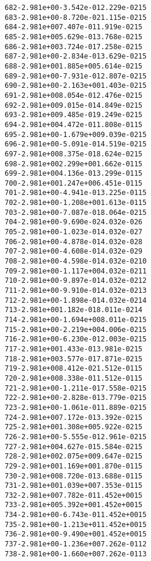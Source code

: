 \begin{alltt}
 682  -2.981e+00  -3.542e-01   2.229e-02   15
 683  -2.981e+00  -8.720e-02   1.115e-02   15
 684  -2.981e+00   7.407e-01   1.919e-02   15
 685  -2.981e+00   5.629e-01   3.768e-02   15
 686  -2.981e+00   3.724e-01   7.258e-02   15
 687  -2.981e+00  -2.834e-01   3.629e-02   15
 688  -2.981e+00   1.885e+00   5.614e-02   15
 689  -2.981e+00  -7.931e-01   2.807e-02   15
 690  -2.981e+00  -2.163e+00   1.403e-02   15
 691  -2.981e+00   8.054e-01   2.476e-02   15
 692  -2.981e+00   9.015e-01   4.849e-02   15
 693  -2.981e+00   9.485e-01   9.249e-02   15
 694  -2.981e+00   4.472e-01   1.808e-01   15
 695  -2.981e+00  -1.679e+00   9.039e-02   15
 696  -2.981e+00  -5.091e-01   4.519e-02   15
 697  -2.981e+00   8.375e-01   8.624e-02   15
 698  -2.981e+00   2.299e+00   1.662e-01   15
 699  -2.981e+00   4.136e-01   3.299e-01   15
 700  -2.981e+00   1.247e+00   6.451e-01   15
 701  -2.981e+00  -4.941e-01   3.225e-01   15
 702  -2.981e+00  -1.208e+00   1.613e-01   15
 703  -2.981e+00  -7.087e-01   8.064e-02   15
 704  -2.981e+00  -9.690e-02   4.032e-02    6
 705  -2.981e+00  -1.023e-01   4.032e-02    7
 706  -2.981e+00  -4.878e-01   4.032e-02    8
 707  -2.981e+00  -4.608e-01   4.032e-02    9
 708  -2.981e+00  -4.598e-01   4.032e-02   10
 709  -2.981e+00  -1.117e+00   4.032e-02   11
 710  -2.981e+00  -9.897e-01   4.032e-02   12
 711  -2.981e+00  -9.910e-01   4.032e-02   13
 712  -2.981e+00  -1.898e-01   4.032e-02   14
 713  -2.981e+00   1.182e-01   8.011e-02   14
 714  -2.981e+00  -1.694e+00   8.011e-02   15
 715  -2.981e+00  -2.219e+00   4.006e-02   15
 716  -2.981e+00  -6.230e-01   2.003e-02   15
 717  -2.981e+00   1.433e-01   3.981e-02   15
 718  -2.981e+00   3.577e-01   7.871e-02   15
 719  -2.981e+00   8.412e-02   1.512e-01   15
 720  -2.981e+00   8.338e-01   1.512e-01   15
 721  -2.981e+00  -1.211e-01   7.558e-02   15
 722  -2.981e+00  -2.828e-01   3.779e-02   15
 723  -2.981e+00  -1.061e-01   1.889e-02   15
 724  -2.981e+00   7.172e-01   3.392e-02   15
 725  -2.981e+00   1.308e+00   5.922e-02   15
 726  -2.981e+00  -5.555e-01   2.961e-02   15
 727  -2.981e+00   4.627e-01   5.584e-02   15
 728  -2.981e+00   2.075e+00   9.647e-02   15
 729  -2.981e+00   1.169e+00   1.870e-01   15
 730  -2.981e+00   8.720e-01   3.688e-01   15
 731  -2.981e+00   1.039e+00   7.353e-01   15
 732  -2.981e+00   7.782e-01   1.452e+00   15
 733  -2.981e+00   5.392e+00   1.452e+00   15
 734  -2.981e+00  -6.743e-01   1.452e+00   15
 735  -2.981e+00  -1.213e+01   1.452e+00   15
 736  -2.981e+00  -9.490e+00   1.452e+00   15
 737  -2.981e+00  -1.236e+00   7.262e-01   12
 738  -2.981e+00  -1.660e+00   7.262e-01   13

\end{alltt}
